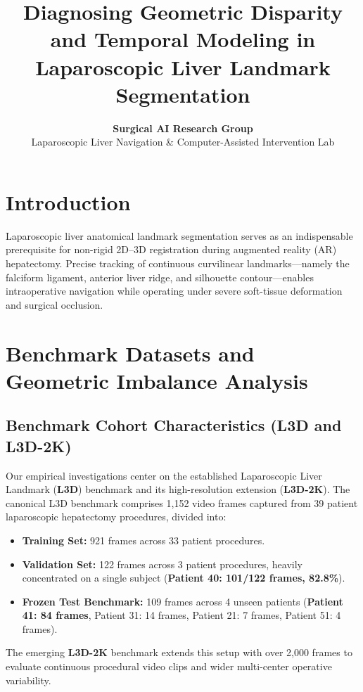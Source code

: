 \documentclass{article}
\title{\textbf{Diagnosing Geometric Disparity and Temporal Modeling in Laparoscopic Liver Landmark Segmentation}}
\author{
    \textbf{Surgical AI Research Group} \\
    Laparoscopic Liver Navigation \& Computer-Assisted Intervention Lab
}
\begin{document}
\maketitle

\section{Introduction}

Laparoscopic liver anatomical landmark segmentation serves as an indispensable prerequisite for 
non-rigid 2D--3D registration during augmented reality (AR) hepatectomy. Precise tracking of continuous 
curvilinear landmarks---namely the falciform ligament, anterior liver ridge, and silhouette contour---enables 
intraoperative navigation while operating under severe soft-tissue deformation and surgical occlusion.

\section{Benchmark Datasets and Geometric Imbalance Analysis}

\subsection{Benchmark Cohort Characteristics (L3D and L3D-2K)}
Our empirical investigations center on the established Laparoscopic Liver Landmark (\textbf{L3D}) benchmark and its high-resolution extension (\textbf{L3D-2K}). 
The canonical L3D benchmark comprises 1,152 video frames captured from 39 patient laparoscopic hepatectomy procedures, divided into:
\begin{itemize}[leftmargin=18pt, topsep=2pt, itemsep=1pt]
    \item \textbf{Training Set:} 921 frames across 33 patient procedures.
    \item \textbf{Validation Set:} 122 frames across 3 patient procedures, heavily concentrated on a single subject (\textbf{Patient 40: 101/122 frames, 82.8\%}).
    \item \textbf{Frozen Test Benchmark:} 109 frames across 4 unseen patients (\textbf{Patient 41: 84 frames}, Patient 31: 14 frames, Patient 21: 7 frames, Patient 51: 4 frames).
\end{itemize}
The emerging \textbf{L3D-2K} benchmark extends this setup with over 2,000 frames to evaluate continuous procedural video clips and wider multi-center operative variability.
\end{document}
